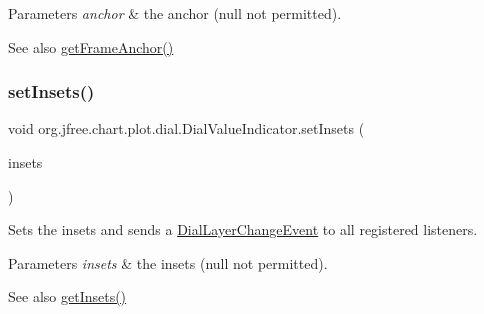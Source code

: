 \begin{DoxyParams}{Parameters}
{\em anchor} & the anchor ({\ttfamily null} not permitted).\\
\hline
\end{DoxyParams}
\begin{DoxySeeAlso}{See also}
\mbox{\hyperlink{classorg_1_1jfree_1_1chart_1_1plot_1_1dial_1_1_dial_value_indicator_a0c511855e967c4f4bca11620ccfd1920}{get\+Frame\+Anchor()}} 
\end{DoxySeeAlso}
\mbox{\label{classorg_1_1jfree_1_1chart_1_1plot_1_1dial_1_1_dial_value_indicator_a6dd9a20b2bc7cdded649eddf0e76fcd6}} 
\subsubsection{\texorpdfstring{set\+Insets()}{setInsets()}}
{\footnotesize\ttfamily void org.\+jfree.\+chart.\+plot.\+dial.\+Dial\+Value\+Indicator.\+set\+Insets (\begin{DoxyParamCaption}\item[{Rectangle\+Insets}]{insets }\end{DoxyParamCaption})}

Sets the insets and sends a \mbox{\hyperlink{classorg_1_1jfree_1_1chart_1_1plot_1_1dial_1_1_dial_layer_change_event}{Dial\+Layer\+Change\+Event}} to all registered listeners.


\begin{DoxyParams}{Parameters}
{\em insets} & the insets ({\ttfamily null} not permitted).\\
\hline
\end{DoxyParams}
\begin{DoxySeeAlso}{See also}
\mbox{\hyperlink{classorg_1_1jfree_1_1chart_1_1plot_1_1dial_1_1_dial_value_indicator_af0d989e123325396bb3ca0ea8a824ff6}{get\+Insets()}} 
\end{DoxySeeAlso}
\mbox{\label{classorg_1_1jfree_1_1chart_1_1plot_1_1dial_1_1_dial_value_indicator_a8d237840259511c2cff7e6872cf34dfe}} 
